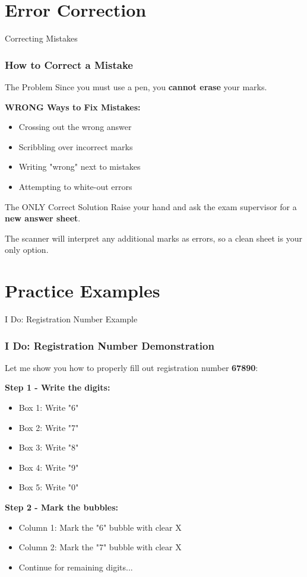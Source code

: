 \documentclass{beamer}
\begin{document}
\section{Error Correction}

\begin{frame}{Correcting Mistakes}
\frametitle{How to Correct a Mistake}
\begin{block}{The Problem}
Since you must use a pen, you \textbf{cannot erase} your marks.
\end{block}

\textbf{WRONG Ways to Fix Mistakes:}
\begin{itemize}
\item Crossing out the wrong answer
\item Scribbling over incorrect marks
\item Writing "wrong" next to mistakes
\item Attempting to white-out errors
\end{itemize}

\begin{block}{The ONLY Correct Solution}
Raise your hand and ask the exam supervisor for a \textbf{new answer sheet}.
\end{block}

The scanner will interpret any additional marks as errors, so a clean sheet is your only option.
\end{frame}

\section{Practice Examples}

\begin{frame}{I Do: Registration Number Example}
\frametitle{I Do: Registration Number Demonstration}
Let me show you how to properly fill out registration number \textbf{67890}:

\textbf{Step 1 - Write the digits:}
\begin{itemize}
\item Box 1: Write "6"
\item Box 2: Write "7" 
\item Box 3: Write "8"
\item Box 4: Write "9"
\item Box 5: Write "0"
\end{itemize}

\textbf{Step 2 - Mark the bubbles:}
\begin{itemize}
\item Column 1: Mark the "6" bubble with clear X
\item Column 2: Mark the "7" bubble with clear X
\item Continue for remaining digits...
\end{itemize}

\end{frame}
\end{document}
